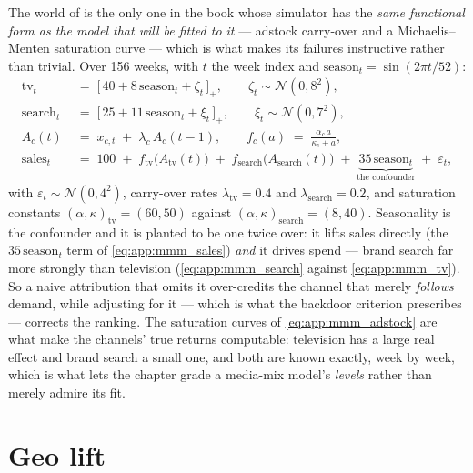 The world of  is the only one in the book whose simulator has the \emph{same functional
form as the model that will be fitted to it} --- adstock carry-over and a Michaelis--Menten saturation
curve --- which is what makes its failures instructive rather than trivial. Over 156 weeks, with
$t$ the week index and $\text{season}_t = \sin(2\pi t / 52)$:
%
\begin{align}
  \text{tv}_t &\;=\; \big[\,40 + 8\,\text{season}_t + \zeta_t\,\big]_{+},
      \qquad \zeta_t \sim \mathcal N(0, 8^{2}), \label{eq:app:mmm_tv}\\
  \text{search}_t &\;=\; \big[\,25 + 11\,\text{season}_t + \xi_t\,\big]_{+},
      \qquad \xi_t \sim \mathcal N(0, 7^{2}), \label{eq:app:mmm_search}\\
  A_c(t) &\;=\; x_{c,t} \;+\; \lambda_c\, A_c(t-1),
      \qquad f_c(a) \;=\; \frac{\alpha_c\, a}{\kappa_c + a},
      \label{eq:app:mmm_adstock}\\
  \text{sales}_t &\;=\; 100 \;+\; f_{\text{tv}}\big(A_{\text{tv}}(t)\big)
       \;+\; f_{\text{search}}\big(A_{\text{search}}(t)\big)
       \;+\; \underbrace{35\,\text{season}_t}_{\text{the confounder}}
       \;+\; \varepsilon_t, \label{eq:app:mmm_sales}
\end{align}
%
with $\varepsilon_t \sim \mathcal N(0, 4^{2})$, carry-over rates $\lambda_{\text{tv}} = 0.4$ and
$\lambda_{\text{search}} = 0.2$, and saturation constants
$(\alpha, \kappa)_{\text{tv}} = (60, 50)$ against
$(\alpha, \kappa)_{\text{search}} = (8, 40)$.
%
Seasonality is the confounder and it is planted to be one twice over: it lifts sales directly
(the $35\,\text{season}_t$ term of \cref{eq:app:mmm_sales}) \emph{and} it drives spend --- brand
search far more strongly than television (\cref{eq:app:mmm_search} against
\cref{eq:app:mmm_tv}). So a naive attribution that omits it over-credits the channel that merely
\emph{follows} demand, while adjusting for it --- which is what the backdoor criterion prescribes
--- corrects the ranking. The saturation curves of \cref{eq:app:mmm_adstock} are what make the
channels' true returns computable: television has a large real effect and brand search a small one,
and both are known exactly, week by week, which is what lets the chapter grade a media-mix model's
\emph{levels} rather than merely admire its fit.

\section{Geo lift}
\label{app:dgp:geo}

